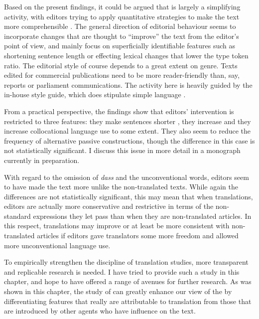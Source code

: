 \documentclass[output=paper]{LSP/langsci}
\begin{document}
Based on the present findings, it could be argued that  is largely a simplifying activity, with editors trying to apply quantitative strategies to make the text more comprehensible \parencite[on this issue, see also][]{mueetal15}. The general direction of editorial behaviour seems to incorporate changes that are thought to \enquote{improve} the text from the editor's point of view, and mainly focus on superficially identifiable features such as shortening sentence length \parencite[on editorial sentence splitting in translation, see][]{bisiada14} or effecting lexical changes that lower the type token ratio. The editorial style of course depends to a great extent on genre. Texts edited for commercial publications need to be more reader-friendly than, say, reports or parliament communications. The  activity here is heavily guided by the in-house style guide, which does stipulate simple language \parencite[3]{bisiada14}.

From a practical perspective, the findings show that editors' intervention is restricted to three features: they make sentences shorter \parencite[by splitting them, as reported for  in][]{bisiada14}, they increase  and they increase collocational language use to some extent. They also seem to reduce the frequency of alternative passive constructions, though the difference in this case is not statistically significant. I discuss this issue in more detail in a monograph currently in preparation.

With regard to the omission of \emph{dass} and the unconventional words, editors seem to have made the text more unlike the non-translated texts. While again the differences are not statistically significant, this may mean that when  translations, editors are actually more conservative and restrictive in terms of the non-standard expressions they let pass than when they are  non-translated articles. In this respect, translations may improve or at least be more consistent with non-translated articles if editors gave translators some more freedom and allowed more unconventional language use.

To empirically strengthen the discipline of translation studies, more transparent and replicable research is needed. I have tried to provide such a study in this chapter, and hope to have offered a range of avenues for further research. As was shown in this chapter, the study of  can greatly enhance our view of the  by differentiating features that really are attributable to translation from those that are introduced by other agents who have influence on the text.
\end{document}
